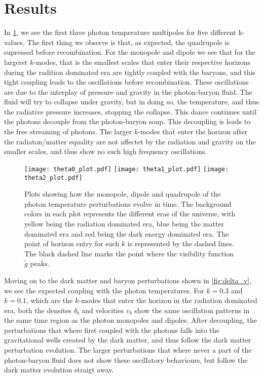 \documentclass[12pt]{article}
\begin{document}
\section{Results}
In \cref{fig:theta}, we see the first three photon temperature multipoles for five different k-values. The first thing we observe is that, as expected, the quadrupole is supressed before recombination. For the monopole and dipole we see that for the largerst $k$-modes, that is the smallest scales that enter their respective horizons during the radition dominated era are tightly coupled with the baryons, and this tight coupling leads to the oscillations before recombination. These oscillations are due to the interplay of pressure and gravity in the photon-baryon fluid. The fluid will try to collapse under gravity, but in doing so, the temperature, and thus the radiative pressure increases, stopping the collapse. This dance continues until the photons decouple from the photon-baryon soup. This decoupling is leads to the free streaming of photons. The larger $k$-modes that enter the horizon after the radiaton/matter equality are not affectet by the radiation and gravity on the smaller scales, and thus show no such high frequency oscillations. 

\begin{figure}[h]
    \centering
    \texttt{[image: theta0\_plot.pdf]} 
    \texttt{[image: theta1\_plot.pdf]} 
    \texttt{[image: theta2\_plot.pdf]}
    \caption{Plots showing how the monopole, dipole and quadrupole of the photon temperature perturbations evolve in time. The background colors in each plot represents the different eras of the universe, with yellow being the radiation dominated era, blue being the matter dominated era and red being the dark energy dominated era. The point of horizon entry for each $k$ is represented by the dashed lines. The black dashed line marks the point where the visibility function $\tilde{g}$ peaks. }
    \label{fig:theta}
\end{figure}

Moving on to the dark matter and baryon perturbations shown in \cref{fig:delta_v}, we see the expected coupling with the photon temperatures. For $k=0.3$ and $k=0.1$, which are the $k$-modes that enter the horizon in the radiation dominated era, both the densites $\delta_b$ and velocities $v_b$ show the same oscillation patterns in the same time region as the photon monopoles and dipoles. After decoupling, the perturbations that where first coupled with the photons falls into the gravitational wells created by the dark matter, and thus follow the dark matter perturbation evolution. The larger perturbations that where never a part of the photon-baryon fluid does not show these oscillatory behaviours, but follow the dark matter evolution straigt away. 
\end{document}
